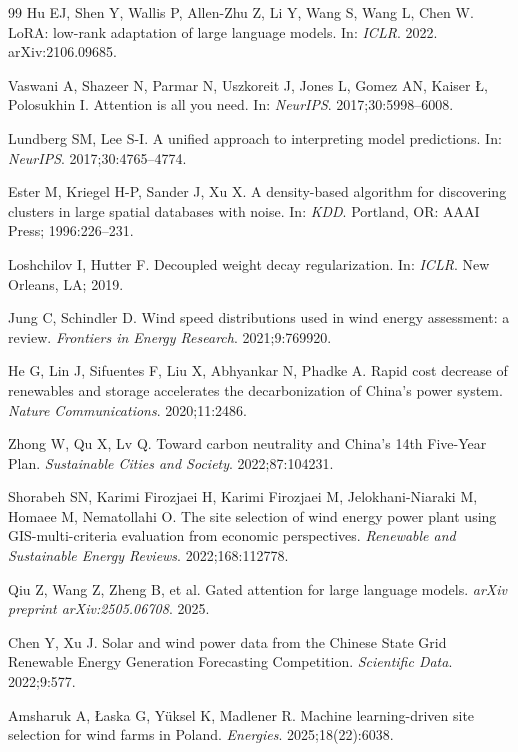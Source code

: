 \documentclass[12pt, a4paper]{article}
\begin{document}
\begin{thebibliography}{99}
Hu EJ, Shen Y, Wallis P, Allen-Zhu Z, Li Y,
Wang S, Wang L, Chen W.
LoRA: low-rank adaptation of large language models.
In: \textit{ICLR}. 2022. arXiv:2106.09685.

Vaswani A, Shazeer N, Parmar N, Uszkoreit J, Jones L,
Gomez AN, Kaiser \L, Polosukhin I.
Attention is all you need.
In: \textit{NeurIPS}. 2017;30:5998--6008.

Lundberg SM, Lee S-I.
A unified approach to interpreting model predictions.
In: \textit{NeurIPS}. 2017;30:4765--4774.

Ester M, Kriegel H-P, Sander J, Xu X.
A density-based algorithm for discovering clusters in large
spatial databases with noise.
In: \textit{KDD}. Portland, OR: AAAI Press; 1996:226--231.

Loshchilov I, Hutter F.
Decoupled weight decay regularization.
In: \textit{ICLR}. New Orleans, LA; 2019.

Jung C, Schindler D.
Wind speed distributions used in wind energy assessment: a review.
\textit{Frontiers in Energy Research}.
2021;9:769920.

He G, Lin J, Sifuentes F, Liu X,
Abhyankar N, Phadke A.
Rapid cost decrease of renewables and storage accelerates
the decarbonization of China's power system.
\textit{Nature Communications}.
2020;11:2486.

Zhong W, Qu X, Lv Q.
Toward carbon neutrality and China's 14th Five-Year Plan.
\textit{Sustainable Cities and Society}.
2022;87:104231.

Shorabeh SN, Karimi Firozjaei H,
Karimi Firozjaei M, Jelokhani-Niaraki M,
Homaee M, Nematollahi O.
The site selection of wind energy power plant using
GIS-multi-criteria evaluation from economic perspectives.
\textit{Renewable and Sustainable Energy Reviews}.
2022;168:112778.

Qiu Z, Wang Z, Zheng B, et al.
Gated attention for large language models.
\textit{arXiv preprint arXiv:2505.06708}. 2025.

Chen Y, Xu J.
Solar and wind power data from the Chinese State Grid
Renewable Energy Generation Forecasting Competition.
\textit{Scientific Data}.
2022;9:577.

Amsharuk A, \L aska G, Y\"{u}ksel K, Madlener R.
Machine learning-driven site selection for wind farms in Poland.
\textit{Energies}.
2025;18(22):6038.


\end{thebibliography}
\end{document}
